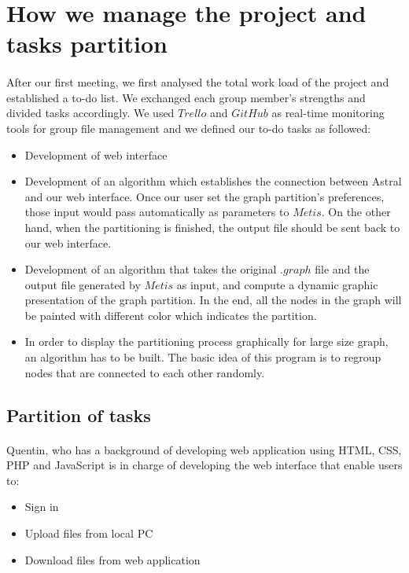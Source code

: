 \documentclass{cranfieldChart}
\begin{document}
\section{How we manage the project and tasks partition}
\paragraph{}
After our first meeting, we first analysed the total work load of the project and established a to-do list. We exchanged each group member's strengths and divided tasks accordingly. We used $Trello$ and $GitHub$ as real-time monitoring tools for group file management and we defined our to-do tasks as followed:
\begin{itemize}
    \item Development of web interface 
    \item Development of an algorithm which establishes the connection between Astral and our web interface. Once our user set the graph partition's preferences, those input would pass automatically as parameters to $Metis$. On the other hand, when the partitioning is finished, the output file should be sent back to our web interface. 
     \item Development of an algorithm that takes the original $.graph$ file and the output file generated by $Metis$ as input, and compute a dynamic graphic presentation of the graph partition. In the end, all the nodes in the graph will be painted with different color which indicates the partition. 
     \item In order to display the partitioning process graphically for large size graph, an algorithm has to be built. The basic idea of this program is to regroup nodes that are connected to each other randomly.   
\end{itemize}

\subsection{Partition of tasks} 
\paragraph{}
Quentin, who has a background of developing web application using HTML, CSS, PHP and JavaScript is in charge of developing the web interface that enable users to: 
\begin{itemize}
    \item Sign in 
    \item Upload files from local PC 
    \item Download files from web application 
\end{itemize}
\end{document}
